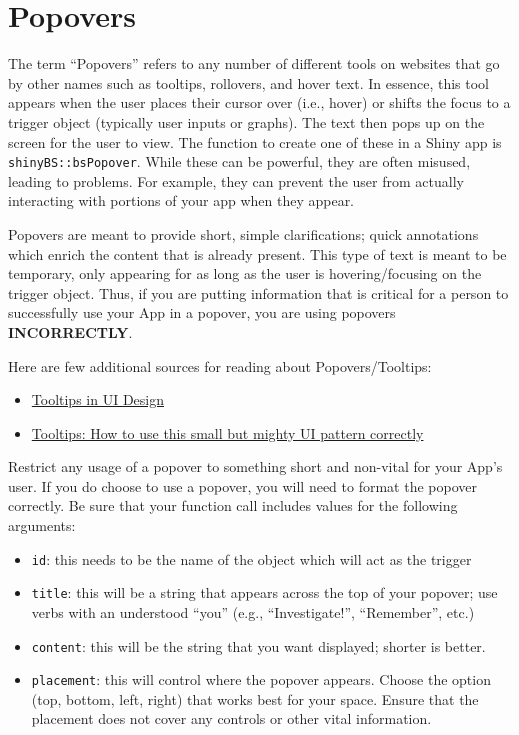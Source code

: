 \documentclass[
]{book}
\providecommand{\tightlist}{%
  \setlength{\itemsep}{0pt}\setlength{\parskip}{0pt}}
\begin{document}
\hypertarget{popovers}{%
\section{Popovers}\label{popovers}}

The term ``Popovers'' refers to any number of different tools on websites that go by other names such as tooltips, rollovers, and hover text. In essence, this tool appears when the user places their cursor over (i.e., hover) or shifts the focus to a trigger object (typically user inputs or graphs). The text then pops up on the screen for the user to view. The function to create one of these in a Shiny app is \texttt{shinyBS::bsPopover}. While these can be powerful, they are often misused, leading to problems. For example, they can prevent the user from actually interacting with portions of your app when they appear.

Popovers are meant to provide short, simple clarifications; quick annotations which enrich the content that is already present. This type of text is meant to be temporary, only appearing for as long as the user is hovering/focusing on the trigger object. Thus, if you are putting information that is critical for a person to successfully use your App in a popover, you are using popovers \textbf{INCORRECTLY}.

Here are few additional sources for reading about Popovers/Tooltips:

\begin{itemize}
\tightlist
\item
  \href{https://uxplanet.org/tooltips-in-ui-design-f63e117aa3d1}{Tooltips in UI Design}
\item
  \href{https://www.appcues.com/blog/tooltips}{Tooltips: How to use this small but mighty UI pattern correctly}
\end{itemize}

Restrict any usage of a popover to something short and non-vital for your App's user. If you do choose to use a popover, you will need to format the popover correctly. Be sure that your function call includes values for the following arguments:

\begin{itemize}
\tightlist
\item
  \texttt{id}: this needs to be the name of the object which will act as the trigger
\item
  \texttt{title}: this will be a string that appears across the top of your popover; use verbs with an understood ``you'' (e.g., ``Investigate!'', ``Remember'', etc.)
\item
  \texttt{content}: this will be the string that you want displayed; shorter is better.
\item
  \texttt{placement}: this will control where the popover appears. Choose the option (top, bottom, left, right) that works best for your space. Ensure that the placement does not cover any controls or other vital information.
\end{itemize}
\end{document}
